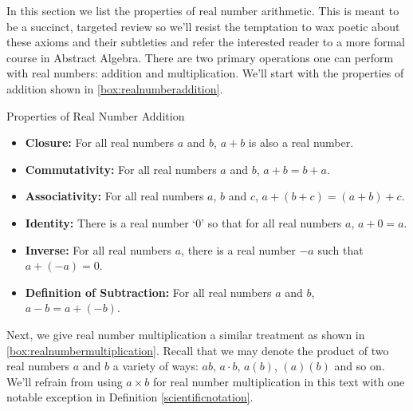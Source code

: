 

\setcounter{footnote}{0}

\label{AppRealNumberArithmetic}


In this section we list the properties of real number arithmetic.  This is meant to be a succinct, targeted review so we'll resist the temptation to wax poetic about these axioms and their subtleties and refer the interested reader to a more formal course in Abstract Algebra.  There are two primary operations one can perform with real numbers:  addition and multiplication.  We'll start with the properties of addition shown in \autoref{box:realnumberaddition}.

\begin{floatbox}[label=box:realnumberaddition]{Properties of Real Number Addition}

\begin{itemize}[leftmargin=*]

\item  \textbf{Closure:}  For all real numbers $a$ and $b$,  $a+b$ is also a real number.
\item  \textbf{Commutativity:}  For all real numbers $a$ and $b$, $a+b = b+a$.
\item  \textbf{Associativity:}  For all real numbers $a$, $b$ and $c$, $a+(b+c) = (a+b)+c$.
\item  \textbf{Identity:}  There is a real number `$0$' so that for all real numbers $a$, $a+0 = a$.
\item  \textbf{Inverse:}  For all real numbers $a$, there is a real number $-a$ such that $a + (-a) = 0$.
\item \textbf{Definition of Subtraction:}  For all real numbers $a$ and $b$, $a - b = a + (-b)$.

\end{itemize}

\end{floatbox}

Next, we give real number multiplication a similar treatment as shown in \autoref{box:realnumbermultiplication}.  Recall that we may denote the product of two real numbers $a$ and $b$ a variety of ways:  $ab$, $a \cdot b$, $a(b)$, $(a)(b)$ and so on.  We'll refrain from using $a \times b$ for real number multiplication in this text with one notable exception in Definition \ref{scientificnotation}.

